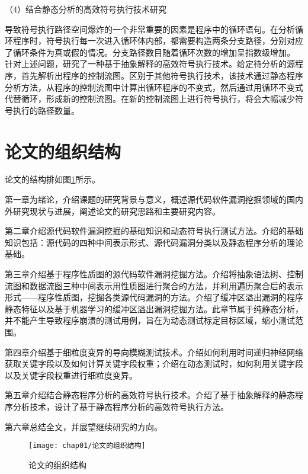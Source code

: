 （4）结合静态分析的高效符号执行技术研究

导致符号执行路径空间爆炸的一个非常重要的因素是程序中的循环语句。在分析循环程序时，符号执行每一次进入循环体内部，都需要构造两条分支路径，分别对应了循环条件为真或假的情况。分支路径数目随着循环次数的增加呈指数级增加。
针对上述问题，研究了一种基于抽象解释的高效符号执行技术。给定待分析的源程序，首先解析出程序的控制流图。区别于其他符号执行技术，该技术通过静态程序分析方法，从程序的控制流图中计算出循环程序的不变式，然后通过用循环不变式代替循环，形成新的控制流图。在新的控制流图上进行符号执行，将会大幅减少符号执行的路径数量。




\section{论文的组织结构}

论文的结构排如图\ref{论文的组织结构}所示。

第一章为绪论，介绍课题的研究背景与意义，概述源代码软件漏洞挖掘领域的国内外研究现状与进展，阐述论文的研究思路和主要研究内容。

第二章介绍源代码软件漏洞挖掘的基础知识和动态符号执行测试方法。介绍的基础知识包括：源代码的四种中间表示形式、源代码漏洞分类以及静态程序分析的理论基础。

第三章介绍基于程序性质图的源代码软件漏洞挖掘方法。介绍将抽象语法树、控制流图和数据流图三种中间表示用性质图进行聚合的方法，并利用遍历聚合后的表示形式——程序性质图，挖掘各类源代码漏洞的方法。介绍了缓冲区溢出漏洞的程序静态特征以及基于机器学习的缓冲区溢出漏洞挖掘方法。此章节属于纯静态分析，并不能产生导致程序崩溃的测试用例，旨在为动态测试标定目标区域，缩小测试范围。

第四章介绍基于细粒度变异的导向模糊测试技术。介绍如何利用时间递归神经网络获取关键字段以及如何计算关键字段权重；介绍在动态测试时，如何利用关键字段以及关键字段权重进行细粒度变异。

第五章介绍结合静态程序分析的高效符号执行技术。介绍了基于抽象解释的静态程序分析技术，设计了基于静态程序分析的高效符号执行方法。


第六章总结全文，并展望继续研究的方向。


\begin{figure}[htb]
\begin{center}
\texttt{[image: chap01/论文的组织结构]}
\end{center}
\caption{论文的组织结构}
\label{论文的组织结构}
\end{figure}

\afterpage{\blankpage}
